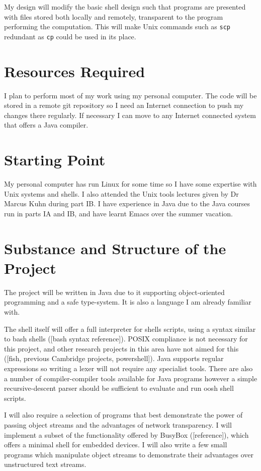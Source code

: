 \documentclass[12pt]{article}
\begin{document}
My design will modify the basic shell design such that programs are
presented with files stored both locally and remotely, transparent to
the program performing the computation. This will make Unix commands
such as \texttt{scp} redundant as \texttt{cp} could be used in its
place.

\section*{Resources Required}
I plan to perform most of my work using my personal computer. The code
will be stored in a remote git repository so I need an Internet
connection to push my changes there regularly. If necessary I can move
to any Internet connected system that offers a Java compiler.

\section*{Starting Point}
My personal computer has run Linux for some time so I have some
expertise with Unix systems and shells. I also attended the Unix tools
lectures given by Dr Marcus Kuhn during part IB. I have experience in
Java due to the Java courses run in parts IA and IB, and have learnt
Emacs over the summer vacation.

\section*{Substance and Structure of the Project}
The project will be written in Java due to it supporting
object-oriented programming and a safe type-system. It is also a
language I am already familiar with.

The shell itself will offer a full interpreter for shells scripts,
using a syntax similar to bash shells ([bash syntax reference]). POSIX
compliance is not necessary for this project, and other research
projects in this area have not aimed for this ([fish, previous
Cambridge projects, powershell]). Java supports regular expressions so
writing a lexer will not require any specialist tools. There are also
a number of compiler-compiler tools available for Java programs
however a simple recursive-descent parser should be sufficient to
evaluate and run oosh shell scripts.

I will also require a selection of programs that best demonstrate the
power of passing object streams and the advantages of network
transparency. I will implement a subset of the functionality offered
by BusyBox ([reference]), which offers a minimal shell for embedded
devices. I will also write a few small programs which manipulate
object streams to demonstrate their advantages over unstructured text
streams.
\end{document}
